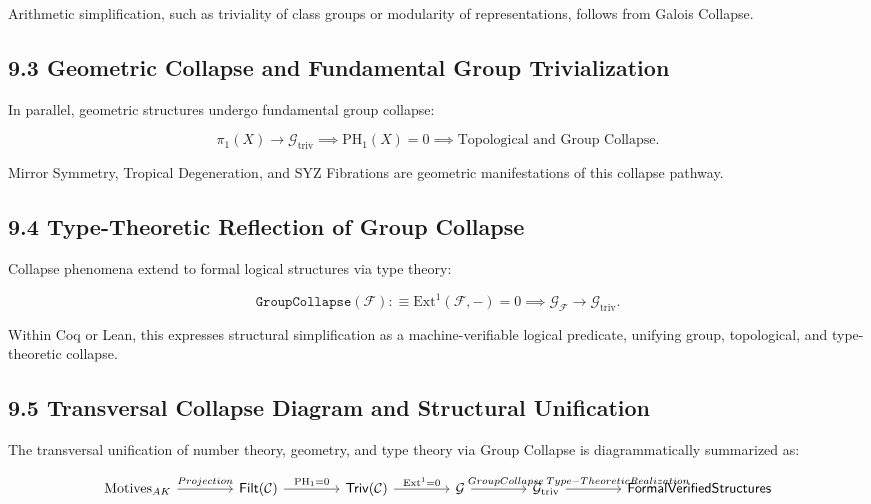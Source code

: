 \documentclass[11pt]{article}
\begin{document}
Arithmetic simplification, such as triviality of class groups or modularity of representations, follows from Galois Collapse.

\subsection*{9.3 Geometric Collapse and Fundamental Group Trivialization}

In parallel, geometric structures undergo fundamental group collapse:

\[
\pi_1(X) \longrightarrow \mathcal{G}_{\mathrm{triv}} \implies \mathrm{PH}_1(X) = 0 \implies \text{Topological and Group Collapse}.
\]

Mirror Symmetry, Tropical Degeneration, and SYZ Fibrations are geometric manifestations of this collapse pathway.

\subsection*{9.4 Type-Theoretic Reflection of Group Collapse}

Collapse phenomena extend to formal logical structures via type theory:

\[
\texttt{GroupCollapse}(\mathcal{F}) :\equiv \mathrm{Ext}^1(\mathcal{F}, -) = 0 \implies \mathcal{G}_{\mathcal{F}} \longrightarrow \mathcal{G}_{\mathrm{triv}}.
\]

Within Coq or Lean, this expresses structural simplification as a machine-verifiable logical predicate, unifying group, topological, and type-theoretic collapse.

\subsection*{9.5 Transversal Collapse Diagram and Structural Unification}

The transversal unification of number theory, geometry, and type theory via Group Collapse is diagrammatically summarized as:

\[
\begin{tikzcd}[column sep=4em]
\mathrm{Motives}_{AK} \arrow[r, "Projection"]
& \mathsf{Filt}(\mathcal{C}) \arrow[r, "\mathrm{PH}_1 = 0"]
& \mathsf{Triv}(\mathcal{C}) \arrow[r, "\mathrm{Ext}^1 = 0"]
& \mathcal{G} \arrow[r, "\hspace{1em}Group Collapse"]
& \mathcal{G}_{\mathrm{triv}} \arrow[r, "\hspace{3.5em}Type-Theoretic Realization"]
& \mathsf{Formal Verified Structures}
\end{tikzcd}
\]
\end{document}
